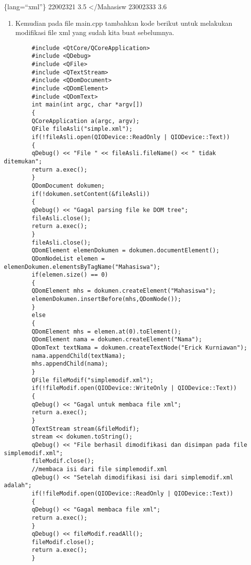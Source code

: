 \{lang=``xml''\} 22002321 3.5 \textless{}/Mahasisw 23002333 3.6

\begin{enumerate}
\def\labelenumi{\arabic{enumi}.}
\setcounter{enumi}{2}
\tightlist
\item
  Kemudian pada file main.cpp tambahkan kode berikut untuk melakukan
  modifikasi file xml yang sudah kita buat sebelumnya.
\end{enumerate}

\begin{verbatim}
        #include <QtCore/QCoreApplication>
        #include <QDebug>
        #include <QFile>
        #include <QTextStream>
        #include <QDomDocument>
        #include <QDomElement>
        #include <QDomText>
        int main(int argc, char *argv[])
        {
        QCoreApplication a(argc, argv);
        QFile fileAsli("simple.xml");
        if(!fileAsli.open(QIODevice::ReadOnly | QIODevice::Text))
        {
        qDebug() << "File " << fileAsli.fileName() << " tidak ditemukan";
        return a.exec();
        }
        QDomDocument dokumen;
        if(!dokumen.setContent(&fileAsli))
        {
        qDebug() << "Gagal parsing file ke DOM tree";
        fileAsli.close();
        return a.exec();
        }
        fileAsli.close();
        QDomElement elemenDokumen = dokumen.documentElement();
        QDomNodeList elemen = elemenDokumen.elementsByTagName("Mahasiswa");
        if(elemen.size() == 0)
        {
        QDomElement mhs = dokumen.createElement("Mahasiswa");
        elemenDokumen.insertBefore(mhs,QDomNode());
        }
        else
        {
        QDomElement mhs = elemen.at(0).toElement();
        QDomElement nama = dokumen.createElement("Nama");
        QDomText textNama = dokumen.createTextNode("Erick Kurniawan");
        nama.appendChild(textNama);
        mhs.appendChild(nama);
        }
        QFile fileModif("simplemodif.xml");
        if(!fileModif.open(QIODevice::WriteOnly | QIODevice::Text))
        {
        qDebug() << "Gagal untuk membaca file xml";
        return a.exec();
        }
        QTextStream stream(&fileModif);
        stream << dokumen.toString();
        qDebug() << "File berhasil dimodifikasi dan disimpan pada file simplemodif.xml";
        fileModif.close();
        //membaca isi dari file simplemodif.xml
        qDebug() << "Setelah dimodifikasi isi dari simplemodif.xml adalah";
        if(!fileModif.open(QIODevice::ReadOnly | QIODevice::Text))
        {
        qDebug() << "Gagal membaca file xml";
        return a.exec();
        }
        qDebug() << fileModif.readAll();
        fileModif.close();
        return a.exec();
        }
\end{verbatim}

